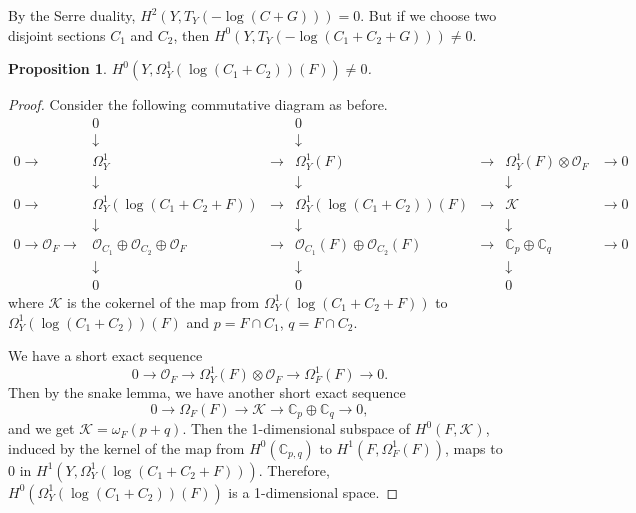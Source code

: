 \documentclass[twoside,11pt]{amsart}
\newtheorem{proposition}{Proposition}[section]
\begin{document}
By the Serre duality, $H^2(Y, T_Y(-{\operatorname{log}}(C+G)))=0$. But if we choose
two disjoint sections $C_1$ and $C_2$, then $H^0(Y,
T_Y(-{\operatorname{log}}(C_1+C_2+G)))\ne 0$.

\begin{proposition}
\label{pro-4.2} $H^0(Y, \Omega_Y^1({\operatorname{log}}(C_1+C_2))(F))\ne 0$.
\end{proposition}

\begin{proof}
Consider the following commutative diagram as before.
\[\begin{array}{ccccccc}
& 0 & & 0& &  & \\
& \downarrow & & \downarrow & &  & \\
0\to & \Omega_Y^1 & \to & \Omega_Y^1(F) & \to & \Omega_Y^1(F)\otimes{{\mathcal O}}_F &\to 0 \\
& \downarrow & & \downarrow & & \downarrow & \\
0\to & \Omega_Y^1({\operatorname{log}}(C_1+C_2+F)) & \to & \Omega_Y^1({\operatorname{log}}(C_1+C_2))(F) & \to & {{\mathcal K}} &\to 0 \\
& \downarrow & & \downarrow & & \downarrow & \\
0\to{{\mathcal O}}_F\to & {{\mathcal O}}_{C_1}\oplus{{\mathcal O}}_{C_2}\oplus{{\mathcal O}}_F & \to &
{{\mathcal O}}_{C_1}(F)\oplus{{\mathcal O}}_{C_2}(F) & \to & {{\mathbb C}}_p\oplus{{\mathbb C}}_q &\to
0\\
& \downarrow & & \downarrow & & \downarrow & \\
& 0 & & 0& & 0 &
\end{array}\]
where ${{\mathcal K}}$ is the cokernel of the map from
$\Omega_Y^1({\operatorname{log}}(C_1+C_2+F))$ to $\Omega_Y^1({\operatorname{log}}(C_1+C_2))(F)$
and $p=F\cap C_1$, $q=F\cap C_2$.

We have a short exact sequence
\[0\to {{\mathcal O}}_F\to \Omega_Y^1(F)\otimes{{\mathcal O}}_F \to \Omega_F^1(F)\to 0.\]
Then by the snake lemma, we have another short exact sequence
\[0\to \Omega_F(F)\to {{\mathcal K}}\to {{\mathbb C}}_p\oplus{{\mathbb C}}_q\to 0,\]
and we get ${{\mathcal K}}=\omega_F(p+q)$. Then the 1-dimensional subspace of
$H^0(F, {{\mathcal K}})$, induced by the kernel of the map from
$H^0({{\mathbb C}}_{p,q})$ to $H^1(F, \Omega_F^1(F))$, maps to 0 in $H^1(Y,
\Omega_Y^1({\operatorname{log}}(C_1+C_2+F)))$. Therefore,
$H^0(\Omega_Y^1({\operatorname{log}}(C_1+C_2))(F))$ is a 1-dimensional space.
\end{proof}
\end{document}
